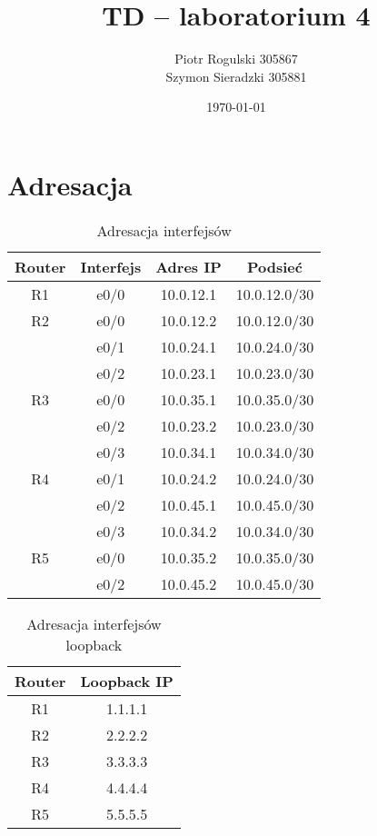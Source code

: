 \documentclass[a4paper,12pt,notitlepage]{article}
\title{\textbf{TD -- laboratorium 4}}
\author{Piotr Rogulski 305867 \\ Szymon Sieradzki 305881}
\date{\today}
\begin{document}
\maketitle

\section{Adresacja}

\begin{table}[htbp]
    \centering
    \caption{Adresacja interfejsów}
    \begin{tabular}{*4c}
        \hline\hline
            \textbf{Router} & \textbf{Interfejs} & \textbf{Adres IP} & \textbf{Podsieć} \\
        \hline
            R1 & e0/0  & 10.0.12.1 & 10.0.12.0/30 \\
        \hline
            R2 & e0/0  & 10.0.12.2 & 10.0.12.0/30 \\
               & e0/1  & 10.0.24.1 & 10.0.24.0/30 \\
               & e0/2  & 10.0.23.1 & 10.0.23.0/30 \\
        \hline
            R3 & e0/0  & 10.0.35.1 & 10.0.35.0/30 \\
               & e0/2  & 10.0.23.2 & 10.0.23.0/30 \\
               & e0/3  & 10.0.34.1 & 10.0.34.0/30 \\
        \hline
            R4 & e0/1  & 10.0.24.2 & 10.0.24.0/30 \\
               & e0/2  & 10.0.45.1 & 10.0.45.0/30 \\
               & e0/3  & 10.0.34.2 & 10.0.34.0/30 \\
        \hline
            R5 & e0/0  & 10.0.35.2 & 10.0.35.0/30 \\
               & e0/2  & 10.0.45.2 & 10.0.45.0/30 \\
        \hline\hline
    \end{tabular}
\end{table}

\begin{table}[htbp]
    \caption{Adresacja interfejsów loopback}
    \centering
    \begin{tabular}{*2c}
        \hline\hline
            \textbf{Router} & \textbf{Loopback IP} \\
        \hline
            R1 & 1.1.1.1 \\
            R2 & 2.2.2.2 \\
            R3 & 3.3.3.3 \\
            R4 & 4.4.4.4 \\
            R5 & 5.5.5.5 \\
        \hline\hline
    \end{tabular}
\end{table}
\end{document}
